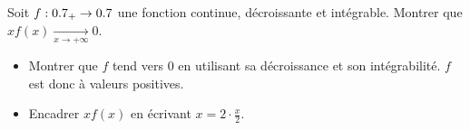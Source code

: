 \begin{exercice}
    Soit $f : 0.7_+ \to 0.7$ une fonction continue, décroissante et intégrable. Montrer que $x f(x) \xrightarrow[x \to +\infty]{} 0$.
\end{exercice}

\begin{elem_sol}
    \begin{itemize}
        \item Montrer que $f$ tend vers 0 en utilisant sa décroissance et son intégrabilité. $f$ est donc à valeurs positives. 
        \item Encadrer $x f(x)$ en écrivant $x=2 \cdot \frac{x}{2}$.
    \end{itemize}
\end{elem_sol}
